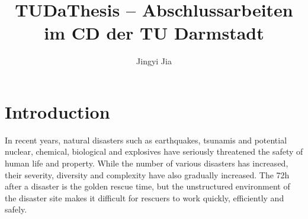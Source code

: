 \documentclass[
	ngerman,
	ruledheaders=section,%
	class=report,%
	thesis={type=bachelor},%
	accentcolor=9c,%
	custommargins=true,%
	marginpar=false,%
	parskip=half-,%
	fontsize=11pt,%
]{tudapub}
\begin{document}

\title{TUDaThesis -- Abschlussarbeiten im CD der TU Darmstadt}
\author{Jingyi Jia}%


\submissiondate{\today}
\examdate{\today}


\maketitle
\affidavit%
\tableofcontents

\chapter{Introduction}
In recent years, natural disasters such as earthquakes, tsunamis and potential nuclear, chemical, biological and explosives have seriously threatened the safety of human life and property. While the number of various disasters has increased, their severity, diversity and complexity have also gradually increased. The 72h after a disaster is the golden rescue time, but the unstructured environment of the disaster site makes it difficult for rescuers to work quickly, efficiently and safely.
\end{document}
